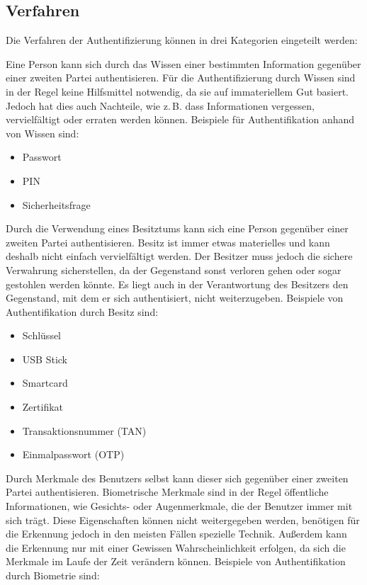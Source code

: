 \documentclass[11pt,a4paper,ngerman]{scrreprt}
\begin{document}
\subsection{Verfahren}
Die Verfahren der Authentifizierung können in drei Kategorien eingeteilt werden:
\begin{description}[font=\rmfamily]
    \item[Wissen:] Eine Person kann sich durch das Wissen einer bestimmten Information gegenüber einer zweiten Partei authentisieren. Für die Authentifizierung durch Wissen sind in der Regel keine Hilfsmittel notwendig, da sie auf immateriellem Gut basiert. Jedoch hat dies auch Nachteile, wie z.\,B. dass Informationen vergessen, vervielfältigt oder erraten werden können. Beispiele für Authentifikation anhand von Wissen sind:
    \begin{itemize}
    \item Passwort
    \item PIN
    \item Sicherheitsfrage
    \end{itemize} 
    \item[Besitz:] Durch die Verwendung eines Besitztums kann sich eine Person gegenüber einer zweiten Partei authentisieren. Besitz ist immer etwas materielles und kann deshalb nicht einfach vervielfältigt werden. Der Besitzer muss jedoch die sichere Verwahrung sicherstellen, da der Gegenstand sonst verloren gehen oder sogar gestohlen werden könnte. Es liegt auch in der Verantwortung des Besitzers den Gegenstand, mit dem er sich authentisiert, nicht weiterzugeben. Beispiele von Authentifikation durch Besitz sind:
    \begin{itemize}
        \item Schlüssel
        \item USB Stick
        \item Smartcard
        \item Zertifikat
        \item Transaktionsnummer (TAN)
        \item Einmalpasswort (OTP)
    \end{itemize}
    \item[Körperliches Merkmal / Biometrie:] Durch Merkmale des Benutzers selbst kann dieser sich gegenüber einer zweiten Partei authentisieren. Biometrische Merkmale sind in der Regel öffentliche Informationen, wie Gesichts- oder Augenmerkmale, die der Benutzer immer mit sich trägt. Diese Eigenschaften können nicht weitergegeben werden, benötigen für die Erkennung jedoch in den meisten Fällen spezielle Technik. Außerdem kann die Erkennung nur mit einer Gewissen Wahrscheinlichkeit erfolgen, da sich die Merkmale im Laufe der Zeit verändern können. Beispiele von Authentifikation durch Biometrie sind:

\end{description}
\end{document}

